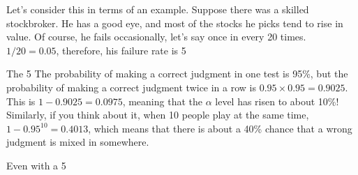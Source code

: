 \documentclass{ltjsarticle}
\begin{document}
Let's consider this in terms of an example. Suppose there was a skilled stockbroker. He has a good eye, and most of the stocks he picks tend to rise in value. Of course, he fails occasionally, let's say once in every 20 times. $1/20 = 0.05$, therefore, his failure rate is 5%

The 5%
The probability of making a correct judgment in one test is 95\%, but the probability of making a correct judgment twice in a row is $0.95 \times 0.95 = 0.9025$. This is $1-0.9025=0.0975$, meaning that the $\alpha$ level has risen to about 10\%! Similarly, if you think about it, when 10 people play at the same time, $1-0.95^{10}=0.4013$, which means that there is about a 40\% chance that a wrong judgment is mixed in somewhere.

Even with a 5%
\end{document}

